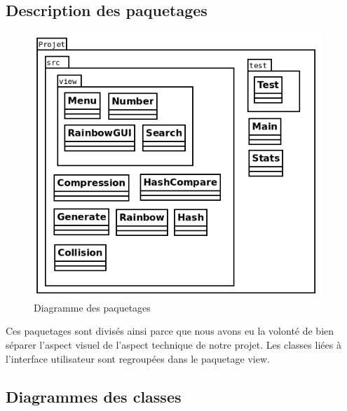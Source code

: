 \documentclass[a4paper,12pt]{article}
\begin{document}
\subsection{Description des paquetages}
\begin{figure}[H]
\centering
\includegraphics[height=10cm]{img/diagramme_paquetage.png}
\caption{Diagramme des paquetages}
\end{figure}
Ces paquetages sont divisés ainsi parce que nous avons eu la volonté de bien séparer l’aspect
visuel de l’aspect technique de notre projet. Les classes liées à l'interface utilisateur sont regroupées dans le paquetage view.

\subsection{Diagrammes des classes}
\end{document}
